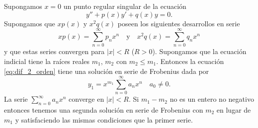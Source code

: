 \begin{teorema}{} Supongamos $x=0$ un punto regular singular de la ecuación
\begin{equation}\label{eq:dif_2_orden} y''+p(x)y'+q(x)y=0.
\end{equation}
Supongamos que $xp(x)$ y $x^2q(x)$ poseen los  siguientes desarrollos en serie
\[xp(x)=\sum_{n=0}^{\infty}p_nx^n\quad\text{y}\quad x^2q(x)=\sum_{n=0}^{\infty}q_nx^n\]
y que estas series convergen para $|x|<R$ ($R>0$). Supongamos que la ecuación indicial tiene la raíces reales $m_1$, $m_2$ con  $m_2\leq m_1$.  Entonces la ecuación \eqref{eq:dif_2_orden}  tiene una solución en serie de Frobenius dada por
\[y_1=x^{m_1}\sum_{n=0}^{\infty}a_nx^n\quad a_0\neq 0.\]
La serie $\sum_{n=0}^{\infty}a_nx^n$ converge en $|x|<R$. Si $m_1-m_2$ no es un entero no negativo entonces tenemos una segunda solución en serie de Frobenius con $m_2$ en lugar de $m_1$ y satisfaciendo las mismas condiciones que la primer serie.
\end{teorema}
